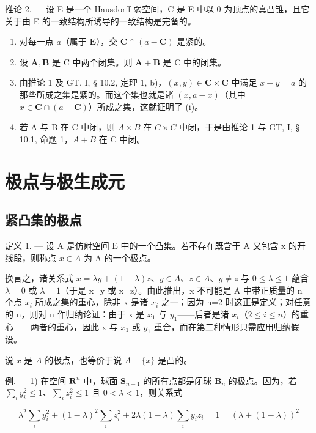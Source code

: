 推论 2. --- 设 E 是一个 Hausdorff 弱空间，C 是 E 中以 0 为顶点的真凸锥，且它关于由 E 的一致结构所诱导的一致结构是完备的。

\begin{enumerate}
\def\labelenumi{(\roman{enumi})}
\item
  对每一点 \(a\)（属于 \(\mathbf{E}\)），交 \(\mathbf{C} \cap (a - \mathbf{C})\) 是紧的。
\item
  设 \(\mathbf{A},\mathbf{B}\) 是 C 中两个闭集。则 \(\mathbf{A} + \mathbf{B}\) 是 C 中的闭集。
\item
  由推论 1 及 GT, I, § 10.2, 定理 1, b)，\((x, y) \in \mathbf{C} \times \mathbf{C}\) 中满足 \(x + y = a\) 的那些所成之集是紧的。而这个集也就是诸 \((x, a - x)\)（其中 \(x \in \mathbf{C} \cap (a - \mathbf{C})\)）所成之集，这就证明了 (i)。
\item
  若 A 与 B 在 C 中闭，则 \(A \times B\) 在 \(C \times C\) 中闭，于是由推论 1 与 GT, I, § 10.1, 命题 1，\(A + B\) 在 C 中闭。
\end{enumerate}

\section{极点与极生成元}

\subsection{紧凸集的极点}

定义 1. --- 设 A 是仿射空间 E 中的一个凸集。若不存在既含于 A 又包含 x 的开线段，则称点 \(x \in A\) 为 A 的一个极点。

换言之，诸关系式 \(x=\lambda y+(1-\lambda)z\)、\(y\in A\)、\(z\in A\)、\(y\neq z\) 与 \(0\leqslant\lambda\leqslant1\) 蕴含 \(\lambda=0\) 或 \(\lambda=1\)（于是 x=y 或 x=z）。由此推出，x 不可能是 A 中带正质量的 n 个点 \(x_{i}\) 所成之集的重心，除非 x 是诸 \(x_{i}\) 之一；因为 n=2 时这正是定义；对任意的 n，则对 n 作归纳论证：由于 x 是 \(x_{1}\) 与 \(y_{1}\)——后者是诸 \(x_{i}\)（\(2\leqslant i\leqslant n\)）的重心——两者的重心，因此 x 与 \(x_{1}\) 或 \(y_{1}\) 重合，而在第二种情形只需应用归纳假设。

说 \(x\) 是 \(A\) 的极点，也等价于说 \(A - \{x\}\) 是凸的。

例. --- 1) 在空间 \(\mathbf{R}^n\) 中，球面 \(\mathbf{S}_{n-1}\) 的所有点都是闭球 \(\mathbf{B}_n\) 的极点。因为，若 \(\sum_{i} y_i^2 \leqslant 1\)、\(\sum_{i} z_i^2 \leqslant 1\) 且 \(0 < \lambda < 1\)，则关系式

\[
\lambda^ {2} \sum_ {i} y _ {i} ^ {2} + (1 - \lambda) ^ {2} \sum_ {i} z _ {i} ^ {2} + 2 \lambda (1 - \lambda) \sum_ {i} y _ {i} z _ {i} = 1 = (\lambda + (1 - \lambda)) ^ {2}
\]

